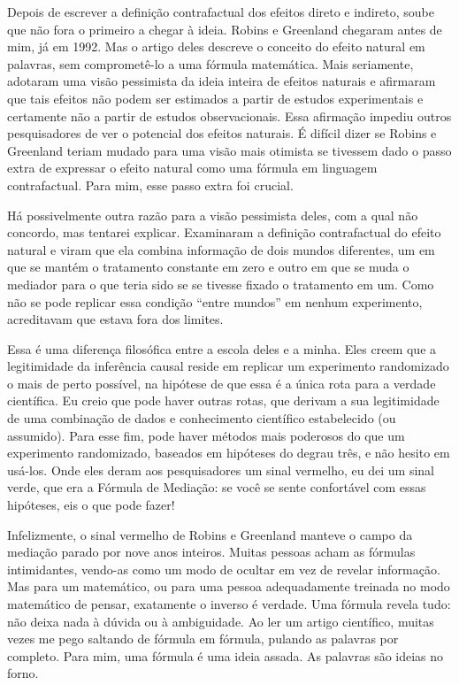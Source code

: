 \documentclass[11pt,a5paper,twoside]{book}
\begin{document}
Depois de escrever a definição contrafactual dos efeitos direto e indireto, soube que não fora o primeiro a chegar à ideia. Robins e Greenland chegaram antes de mim, já em 1992. Mas o artigo deles descreve o conceito do efeito natural em palavras, sem comprometê-lo a uma fórmula matemática. Mais seriamente, adotaram uma visão pessimista da ideia inteira de efeitos naturais e afirmaram que tais efeitos não podem ser estimados a partir de estudos experimentais e certamente não a partir de estudos observacionais. Essa afirmação impediu outros pesquisadores de ver o potencial dos efeitos naturais. É difícil dizer se Robins e Greenland teriam mudado para uma visão mais otimista se tivessem dado o passo extra de expressar o efeito natural como uma fórmula em linguagem contrafactual. Para mim, esse passo extra foi crucial.

Há possivelmente outra razão para a visão pessimista deles, com a qual não concordo, mas tentarei explicar. Examinaram a definição contrafactual do efeito natural e viram que ela combina informação de dois mundos diferentes, um em que se mantém o tratamento constante em zero e outro em que se muda o mediador para o que teria sido se se tivesse fixado o tratamento em um. Como não se pode replicar essa condição “entre mundos” em nenhum experimento, acreditavam que estava fora dos limites.

Essa é uma diferença filosófica entre a escola deles e a minha. Eles creem que a legitimidade da inferência causal reside em replicar um experimento randomizado o mais de perto possível, na hipótese de que essa é a única rota para a verdade científica. Eu creio que pode haver outras rotas, que derivam a sua legitimidade de uma combinação de dados e conhecimento científico estabelecido (ou assumido). Para esse fim, pode haver métodos mais poderosos do que um experimento randomizado, baseados em hipóteses do degrau três, e não hesito em usá-los. Onde eles deram aos pesquisadores um sinal vermelho, eu dei um sinal verde, que era a Fórmula de Mediação: se você se sente confortável com essas hipóteses, eis o que pode fazer!

Infelizmente, o sinal vermelho de Robins e Greenland manteve o campo da mediação parado por nove anos inteiros. Muitas pessoas acham as fórmulas intimidantes, vendo-as como um modo de ocultar em vez de revelar informação. Mas para um matemático, ou para uma pessoa adequadamente treinada no modo matemático de pensar, exatamente o inverso é verdade. Uma fórmula revela tudo: não deixa nada à dúvida ou à ambiguidade. Ao ler um artigo científico, muitas vezes me pego saltando de fórmula em fórmula, pulando as palavras por completo. Para mim, uma fórmula é uma ideia assada. As palavras são ideias no forno.
\end{document}
